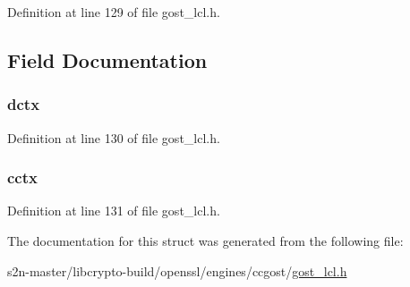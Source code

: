 Definition at line 129 of file gost\+\_\+lcl.\+h.



\subsection{Field Documentation}
\subsubsection[{\texorpdfstring{dctx}{dctx}}]{ dctx}\hypertarget{structossl__gost__digest__ctx_ad00dbdfd4b54c6c19ef82eae98a5b5ed}{}\label{structossl__gost__digest__ctx_ad00dbdfd4b54c6c19ef82eae98a5b5ed}


Definition at line 130 of file gost\+\_\+lcl.\+h.

\subsubsection[{\texorpdfstring{cctx}{cctx}}]{ cctx}\hypertarget{structossl__gost__digest__ctx_a4536f57bd141b77644121499b784cabf}{}\label{structossl__gost__digest__ctx_a4536f57bd141b77644121499b784cabf}


Definition at line 131 of file gost\+\_\+lcl.\+h.



The documentation for this struct was generated from the following file\+:\begin{DoxyCompactItemize}
\item 
s2n-\/master/libcrypto-\/build/openssl/engines/ccgost/\hyperlink{gost__lcl_8h}{gost\+\_\+lcl.\+h}\end{DoxyCompactItemize}
